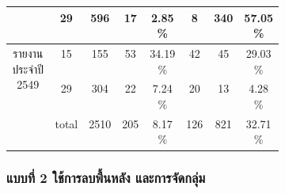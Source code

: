 \begin{table}[H]
\begin{tabular}{|c|c|c|p{0.1\linewidth}|p{0.1\linewidth}|c|p{0.1\linewidth}|p{0.1\linewidth}|}
                                            & 29    & 596       & \multicolumn{1}{c|}{17 }         & \multicolumn{1}{c|}{2.85 \% } & \multicolumn{1}{c|}{8  }    & \multicolumn{1}{c|}{340}             & \multicolumn{1}{c|}{57.05 \%} \\ \hline
        \multirow{2}{*}{รายงานประจำปี 2549}   & 15    & 155       & \multicolumn{1}{c|}{53 }         & \multicolumn{1}{c|}{34.19 \%}  &\multicolumn{1}{c|}{42}     &\multicolumn{1}{c|}{45}              &\multicolumn{1}{c|}{29.03 \%} \\ \cline{2-8} 
                                            & 29    & 304       & \multicolumn{1}{c|}{22 }         & \multicolumn{1}{c|}{7.24 \% } & \multicolumn{1}{c|}{20 }    & \multicolumn{1}{c|}{13 }             & \multicolumn{1}{c|}{4.28 \%}\\ \hline
        \multicolumn{1}{|l|}{}              & total & 2510      & \multicolumn{1}{c|}{205}         & \multicolumn{1}{c|}{8.17 \% } & \multicolumn{1}{c|}{126}    & \multicolumn{1}{c|}{821}             & \multicolumn{1}{c|}{32.71 \%} \\ \hline
        \end{tabular}
        \end{table}

\subsubsection{แบบที่ 2 ใช้การลบพื้นหลัง และการจัดกลุ่ม}

